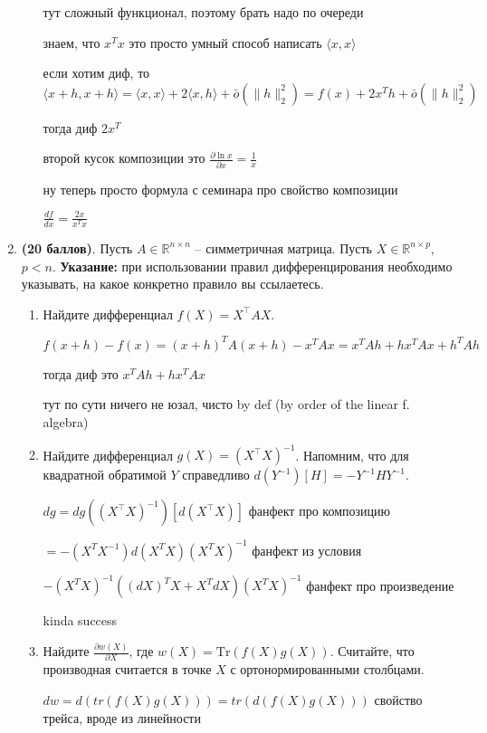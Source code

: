 \documentclass[a4paper, 11pt]{article}
\newcommand{\prob}[1]{\item \textbf{(#1 баллов)}.}
\begin{document}
\begin{enumerate}
\begin{enumerate}
			тут сложный функционал, поэтому брать надо по очереди 
			
			знаем, что $x^T x $ это просто умный способ написать $\langle x, x \rangle $
			
			если хотим диф, то $\langle x + h, x + h \rangle = \langle x, x \rangle + 2 \langle x, h \rangle + \bar o(\|h\|_2^2) = f(x) + 2x^Th + \bar o(\|h\|_2^2)$
			
			тогда диф $2x^T$
			
			второй кусок композиции это $\frac{\partial \ln{x}}{\partial x} = \frac{1}{x}$
			
			ну теперь просто формула с семинара про свойство композиции 
			
			$\frac{df}{dx} = \frac{2x}{x^Tx}$
		
	\end{enumerate}
	\prob{20}
	Пусть $A\in\mathbb{R}^{n\times n}$ -- симметричная матрица. Пусть $X\in\mathbb{R}^{n\times p}$, $p< n$. \textbf{Указание:} при использовании правил дифференцирования необходимо указывать, на какое конкретно правило вы ссылаетесь.
	\begin{enumerate}
		\item Найдите дифференциал $f(X) = X^\top A X$.
		
			$f(x + h) - f(x) = (x + h)^T A (x + h) - x^TAx = x^T Ah + hx^TAx + h^TAh$
			
			тогда диф это $x^T Ah + hx^TAx$
			
			тут по сути ничего не юзал, чисто by def (by order of the linear f. algebra)
		
		\item Найдите дифференциал $g(X) = (X^\top X)^{-1}$.
		Напомним, что для квадратной обратимой $Y$ справедливо $d(Y^{-1})[H] = - Y^{-1} H Y^{-1}$.
		
			$dg = dg((X^\top X)^{-1})[d(X^\top X)] $ фанфект про композицию
			
			$= -(X^T X^{-1}) d(X^T X) (X^T X)^{-1} $ фанфект из условия
			
			$-(X^T X)^{-1} ((dX)^T X + X^T dX) (X^T X)^{-1}$ фанфект про произведение 
			
			kinda success
		
		\item Найдите $\frac{\partial w(X)}{\partial X}$, где $w(X) = \mathrm{Tr}(f(X) g(X))$. Считайте, что производная считается в точке $X$ с ортонормированными столбцами.
		
			$dw = d(tr(f(X) g(X))) = tr(d(f(X)g(X)))$ свойство трейса, вроде из линейности
			

\end{enumerate}
\end{enumerate}
\end{document}
